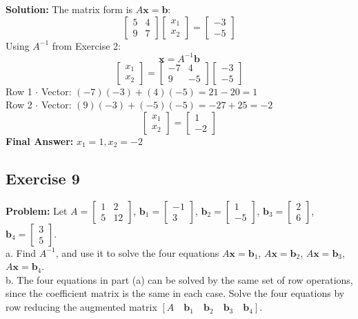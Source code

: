 \documentclass[11pt]{article}
\begin{document}
\textbf{Solution:}
The matrix form is $A\mathbf{x} = \mathbf{b}$:
\[ \begin{bmatrix} 5 & 4 \\ 9 & 7 \end{bmatrix} \begin{bmatrix} x_1 \\ x_2 \end{bmatrix} = \begin{bmatrix} -3 \\ -5 \end{bmatrix} \]
Using $A^{-1}$ from Exercise 2:
\[ \mathbf{x} = A^{-1} \mathbf{b} \]
\[ \begin{bmatrix} x_1 \\ x_2 \end{bmatrix} = \begin{bmatrix} -7 & 4 \\ 9 & -5 \end{bmatrix} \begin{bmatrix} -3 \\ -5 \end{bmatrix} \]
Row 1 $\cdot$ Vector: $(-7)(-3) + (4)(-5) = 21 - 20 = 1$ \\
Row 2 $\cdot$ Vector: $(9)(-3) + (-5)(-5) = -27 + 25 = -2$
\[ \begin{bmatrix} x_1 \\ x_2 \end{bmatrix} = \begin{bmatrix} 1 \\ -2 \end{bmatrix} \]
\textbf{Final Answer:} $x_1 = 1, x_2 = -2$

\subsection{Exercise 9}
\textbf{Problem:} Let $A = \begin{bmatrix} 1 & 2 \\ 5 & 12 \end{bmatrix}$, $\mathbf{b}_1 = \begin{bmatrix} -1 \\ 3 \end{bmatrix}$, $\mathbf{b}_2 = \begin{bmatrix} 1 \\ -5 \end{bmatrix}$, $\mathbf{b}_3 = \begin{bmatrix} 2 \\ 6 \end{bmatrix}$, $\mathbf{b}_4 = \begin{bmatrix} 3 \\ 5 \end{bmatrix}$. \\
a. Find $A^{-1}$, and use it to solve the four equations $A\mathbf{x} = \mathbf{b}_1$, $A\mathbf{x} = \mathbf{b}_2$, $A\mathbf{x} = \mathbf{b}_3$, $A\mathbf{x} = \mathbf{b}_4$. \\
b. The four equations in part (a) can be solved by the same set of row operations, since the coefficient matrix is the same in each case. Solve the four equations by row reducing the augmented matrix $[ A \quad \mathbf{b}_1 \quad \mathbf{b}_2 \quad \mathbf{b}_3 \quad \mathbf{b}_4 ]$.
\end{document}
